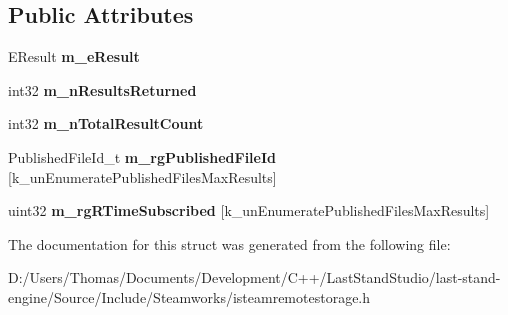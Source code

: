 \subsection*{Public Attributes}
\begin{DoxyCompactItemize}
\item 
\hypertarget{structRemoteStorageEnumerateUserSubscribedFilesResult__t_adcc10625e74e6d3218ff6a4832d03319}{}E\+Result {\bfseries m\+\_\+e\+Result}\label{structRemoteStorageEnumerateUserSubscribedFilesResult__t_adcc10625e74e6d3218ff6a4832d03319}

\item 
\hypertarget{structRemoteStorageEnumerateUserSubscribedFilesResult__t_a57650e55de87db77e55c7b446a183f1a}{}int32 {\bfseries m\+\_\+n\+Results\+Returned}\label{structRemoteStorageEnumerateUserSubscribedFilesResult__t_a57650e55de87db77e55c7b446a183f1a}

\item 
\hypertarget{structRemoteStorageEnumerateUserSubscribedFilesResult__t_aedd17574dd675508deb18800788053cf}{}int32 {\bfseries m\+\_\+n\+Total\+Result\+Count}\label{structRemoteStorageEnumerateUserSubscribedFilesResult__t_aedd17574dd675508deb18800788053cf}

\item 
\hypertarget{structRemoteStorageEnumerateUserSubscribedFilesResult__t_ab50056d64ad7375e08d8702fcc4d5669}{}Published\+File\+Id\+\_\+t {\bfseries m\+\_\+rg\+Published\+File\+Id} \mbox{[}k\+\_\+un\+Enumerate\+Published\+Files\+Max\+Results\mbox{]}\label{structRemoteStorageEnumerateUserSubscribedFilesResult__t_ab50056d64ad7375e08d8702fcc4d5669}

\item 
\hypertarget{structRemoteStorageEnumerateUserSubscribedFilesResult__t_a904b88434566579dd348658868188225}{}uint32 {\bfseries m\+\_\+rg\+R\+Time\+Subscribed} \mbox{[}k\+\_\+un\+Enumerate\+Published\+Files\+Max\+Results\mbox{]}\label{structRemoteStorageEnumerateUserSubscribedFilesResult__t_a904b88434566579dd348658868188225}

\end{DoxyCompactItemize}


The documentation for this struct was generated from the following file\+:\begin{DoxyCompactItemize}
\item 
D\+:/\+Users/\+Thomas/\+Documents/\+Development/\+C++/\+Last\+Stand\+Studio/last-\/stand-\/engine/\+Source/\+Include/\+Steamworks/isteamremotestorage.\+h\end{DoxyCompactItemize}
